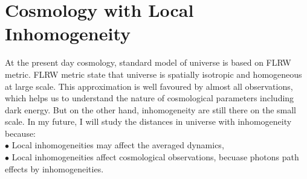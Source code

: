 \documentclass[12pt]{report}
\begin{document}
\section{Cosmology with  Local Inhomogeneity }
At the present day cosmology, standard model of universe is based on FLRW metric. FLRW metric state that universe is spatially isotropic and homogeneous at large scale. This approximation is well favoured by almost all observations, which helps us to understand the nature of cosmological parameters including dark energy.  But on the other hand, inhomogeneity are still there on the small scale. In my future, I will study the distances in  universe with inhomogeneity because: 
\vspace{2mm}\\
$\bullet$ Local inhomogeneities may affect the averaged dynamics,\\
$\bullet$ Local inhomogeneities affect cosmological observations, becuase photons path effects by inhomogeneities.
\end{document}
